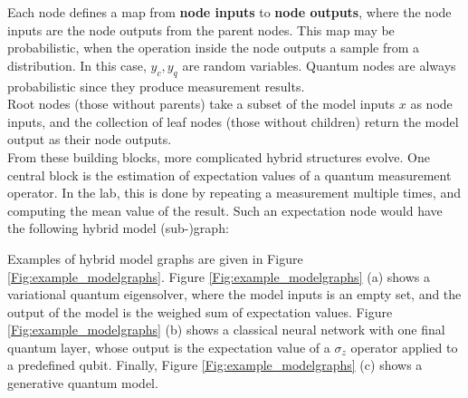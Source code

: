 \documentclass[aps,pra,10pt,twocolumn,groupedaddress,nofootinbib]{revtex4-1}
\theoremstyle{plain}
\newcommand{\ket}[1]{\ensuremath{\left| #1 \right \rangle}}
\begin{document}
Each node defines a map from \textbf{node inputs} to \textbf{node outputs}, where the node inputs are the node outputs from the parent nodes. This map may be probabilistic, when the operation inside the node outputs a sample from a distribution. In this case, $y_c, y_q$ are random variables. Quantum nodes are always probabilistic since they produce measurement results.\\ 

Root nodes (those without parents) take a subset of the model inputs $x$ as node inputs, and the collection of leaf nodes (those without children) return the model output as their node outputs. \\

From these building blocks, more complicated hybrid structures evolve. One central block is the estimation of expectation values of a quantum measurement operator. In the lab, this is done by repeating a measurement multiple times, and computing the mean value of the result. Such an expectation node would have the following hybrid model (sub-)graph:

\begin{figure}[h]
\end{figure}

Examples of hybrid model graphs are given in Figure \ref{Fig:example_modelgraphs}. Figure \ref{Fig:example_modelgraphs} (a) shows a variational quantum eigensolver, where the model inputs is an empty set, and the output of the model is the weighed sum of expectation values. Figure \ref{Fig:example_modelgraphs} (b) shows a classical neural network with one final quantum layer, whose output is the expectation value of a $\sigma_z$ operator applied to a predefined qubit. Finally, Figure \ref{Fig:example_modelgraphs} (c) shows a generative quantum model. 
\end{document}
